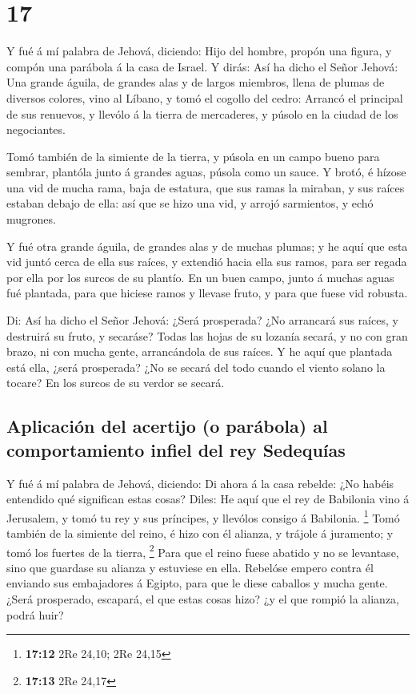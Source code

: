 \hypertarget{section-16}{%
\section{17}\label{section-16}}

 Y fué á mí palabra de Jehová, diciendo:  Hijo
del hombre, propón una figura, y compón una parábola á la casa de
Israel.  Y dirás: Así ha dicho el Señor Jehová: Una grande
águila, de grandes alas y de largos miembros, llena de plumas de
diversos colores, vino al Líbano, y tomó el cogollo del cedro:
 Arrancó el principal de sus renuevos, y llevólo á la tierra
de mercaderes, y púsolo en la ciudad de los negociantes.

 Tomó también de la simiente de la tierra, y púsola en un
campo bueno para sembrar, plantóla junto á grandes aguas, púsola como un
sauce.  Y brotó, é hízose una vid de mucha rama, baja de
estatura, que sus ramas la miraban, y sus raíces estaban debajo de ella:
así que se hizo una vid, y arrojó sarmientos, y echó mugrones.

 Y fué otra grande águila, de grandes alas y de muchas
plumas; y he aquí que esta vid juntó cerca de ella sus raíces, y
extendió hacia ella sus ramos, para ser regada por ella por los surcos
de su plantío.  En un buen campo, junto á muchas aguas fué
plantada, para que hiciese ramos y llevase fruto, y para que fuese vid
robusta.

 Di: Así ha dicho el Señor Jehová: ¿Será prosperada? ¿No
arrancará sus raíces, y destruirá su fruto, y secaráse? Todas las hojas
de su lozanía secará, y no con gran brazo, ni con mucha gente,
arrancándola de sus raíces.  Y he aquí que plantada está
ella, ¿será prosperada? ¿No se secará del todo cuando el viento solano
la tocare? En los surcos de su verdor se secará.

\hypertarget{aplicaciuxf3n-del-acertijo-o-paruxe1bola-al-comportamiento-infiel-del-rey-sedequuxedas}{%
\subsection{Aplicación del acertijo (o parábola) al comportamiento
infiel del rey
Sedequías}\label{aplicaciuxf3n-del-acertijo-o-paruxe1bola-al-comportamiento-infiel-del-rey-sedequuxedas}}

 Y fué á mí palabra de Jehová, diciendo:  Di
ahora á la casa rebelde: ¿No habéis entendido qué significan estas
cosas? Diles: He aquí que el rey de Babilonia vino á Jerusalem, y tomó
tu rey y sus príncipes, y llevólos consigo á Babilonia. \footnote{\textbf{17:12}
  2Re 24,10; 2Re 24,15}  Tomó también de la simiente del
reino, é hizo con él alianza, y trájole á juramento; y tomó los fuertes
de la tierra, \footnote{\textbf{17:13} 2Re 24,17}  Para que
el reino fuese abatido y no se levantase, sino que guardase su alianza y
estuviese en ella.  Rebelóse empero contra él enviando sus
embajadores á Egipto, para que le diese caballos y mucha gente. ¿Será
prosperado, escapará, el que estas cosas hizo? ¿y el que rompió la
alianza, podrá huir?

